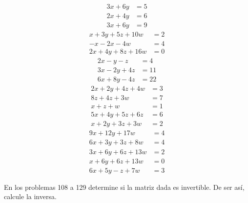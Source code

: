 \begin{tasks}[
    start=94,
    style=enumerate,
    label-offset = 3mm,
    ]
\begin{align*}
    3x+6y &= 5
    \end{align*}
    \task
    \begin{align*}
    2x+4y &= 6 \\
    3x+6y &= 9
    \end{align*}
    \task
    \begin{align*}
    x+3y+5z+10w &= 2 \\
    -x-2x-4w &= 4 \\
    2x+4y+8z+16w &= 0
    \end{align*}
    \task
    \begin{align*}
    2x-y-z &= 4 \\
    3x-2y+4z &= 11 \\
    6x+8y-4z &= 22
    \end{align*}
    \task
    \begin{align*}
    2x+2y+4z+4w &= 3 \\
    8z+4z+3w &= 7 \\
    x+z+w &= 1 \\
    5x+4y+5z+6z &= 6 \\
    x+2y+3z+3w &= 2
    \end{align*}
    \task
    \begin{align*}
    9x+12y+17w &= 4 \\
    6x+3y+3z+8w &= 4 \\
    3x+6y+6z+13w &= 2 \\
    x+6y+6z+13w &= 0 \\
    6x+5y-z+7w &= 3
    \end{align*}
\end{tasks}\newpage\noindent
En los problemas 108 a 129 determine si la matriz dada es invertible. De ser así, calcule la inversa.
